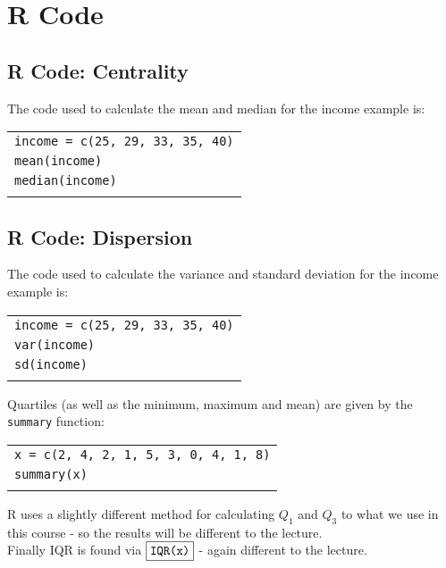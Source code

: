 \section{R Code}
\subsection{R Code: Centrality}
\begin{frame}{\bf {}}
The code used to calculate the mean and median for the income example is:\\[0.6cm]
\begin{tabular}{|l|}
\hline
\texttt{income = c(25, 29, 33, 35, 40)}\\
\texttt{mean(income)}\\
\texttt{median(income)}\\
\hline
\multicolumn{1}{c}{}\\[-0.1cm]
\end{tabular}

\end{frame}

\subsection{R Code: Dispersion}
\begin{frame}{\bf {}}
The code used to calculate the variance and standard deviation for the income example is:\\[0.1cm]
\begin{tabular}{|l|}
\hline
\texttt{income = c(25, 29, 33, 35, 40)}\\
\texttt{var(income)}\\
\texttt{sd(income)}\\
\hline
\multicolumn{1}{c}{}\\[0.1cm]
\end{tabular}

Quartiles (as well as the minimum, maximum and mean) are given by the \texttt{summary} function:\\[0.1cm]
\begin{tabular}{|l|}
\hline
\texttt{x = c(2, 4, 2, 1, 5, 3, 0, 4, 1, 8)}\\
\texttt{summary(x)}\\
\hline
\multicolumn{1}{c}{}\\[-0.1cm]
\end{tabular}

R uses a slightly different method for calculating $Q_1$ and $Q_3$ to what we use in this course - so the results will be different to the lecture.\\[0.4cm]

Finally IQR is found via $\boxed{\text{\texttt{IQR(x)}}}$ - again different to the lecture.
\end{frame}


